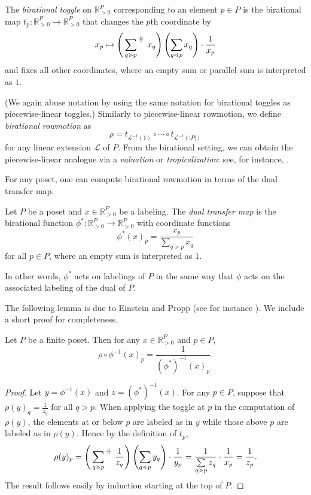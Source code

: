 \documentclass[ALCO,Unicode,published]{cedram}
\numberwithin{equation}{section}
\newcommand{\parallelsum}{\:\ \mathclap{\|}\mathclap{-}\ \:}
\begin{document}
\begin{Def}
The \textit{birational toggle} on $\mathbb{R}^{P}_{>0}$ corresponding to an element $p \in P$ is the birational map $t_p\colon \mathbb{R}^{P}_{>0} \to \mathbb{R}^{P}_{>0}$ that changes the $p$th coordinate by
\[x_p \mapsto \left( \sideset{}{^{\parallelsum}} \sum\limits_{q \gtrdot p} x_q \right) \left( \sum\limits_{q \lessdot p} x_q \right) \cdot \frac{1}{x_p}\]
and fixes all other coordinates, where an empty sum or parallel sum is interpreted as $1$.
\end{Def}
(We again abuse notation by using the same notation for birational toggles as piecewise-linear toggles.) Similarly to piecewise-linear rowmotion, we define \textit{birational rowmotion} as
\[\rho = t_{\mathcal{L}^{-1}(1)} \circ \cdots \circ t_{\mathcal{L}^{-1}(|P|)}\]
for any linear extension $\mathcal{L}$ of $P$. From the birational setting, we can obtain the piecewise-linear analogue via a \textit{valuation} or \emph{tropicalization}: see, for instance, \cite{einsteinpropp2,einsteinpropp1}. 

For any poset, one can compute birational rowmotion in terms of the dual transfer map.

\begin{Def}
Let $P$ be a poset and $x \in \mathbb{R}_{>0}^{P}$ be a labeling. The \emph{dual transfer map} is the birational function $\phi^*\colon\mathbb{R}_{>0}^{P} \to \mathbb{R}_{>0}^{P}$ with coordinate functions
\[\phi^*(x)_p = \frac{x_p}{\sum\limits_{q \gtrdot p} x_q}\]
for all $p \in P$, where an empty sum is interpreted as $1$.
\end{Def}

In other words, $\phi^*$ acts on labelings of $P$ in the same way that $\phi$ acts on the associated labeling of the dual of $P$. 

The following lemma is due to Einstein and Propp (see for instance \cite{einsteinpropp2,josephroby2}). We include a short proof for completeness.

\begin{Lemma} \label{lemma:dualtransfer}
Let $P$ be a finite poset. Then for any $x \in \mathbb{R}_{>0}^{P}$ and $p \in P$,
\[ \rho \circ \phi^{-1}(x)_p = \frac{1}{\left(\phi^*\right)^{-1}(x)_p}.\]
\end{Lemma}
\begin{proof}
Let $y = \phi^{-1}(x)$ and $z = (\phi^*)^{-1}(x)$. For any $p \in P$, suppose that $\rho(y)_q = \frac{1}{z_q}$ for all $q > p$. When applying the toggle at $p$ in the computation of $\rho(y)$, the elements at or below $p$ are labeled as in $y$ while those above $p$ are labeled as in $\rho(y)$. Hence by the definition of $t_p$,
\[
    \rho(y)_p =  \left( \sideset{}{^{\parallelsum}} \sum\limits_{q \gtrdot p} \frac{1}{z_q} \right) \left(\sum\limits_{q \lessdot p} y_q \right) \cdot \frac{1}{y_p}  = \frac{1}{\sum\limits_{q \gtrdot p}z_q} \cdot \frac{1}{x_p} = \frac{1}{z_p}.
\]
The result follows easily by induction starting at the top of $P$.
\end{proof}
\end{document}
